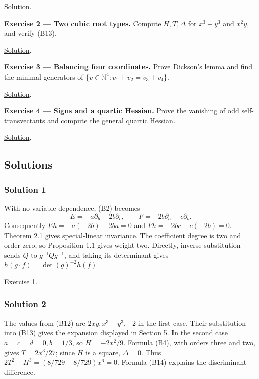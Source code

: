 \documentclass[
]{article}
\begin{document}
\hyperref[solution-1]{Solution}.

\protect{}\label{exercise-2}{}

\textbf{Exercise 2 --- Two cubic root types.} Compute \(H,T,\Delta\) for
\(x^3+y^3\) and \(x^2y\), and verify (B13).

\hyperref[solution-2]{Solution}.

\protect{}\label{exercise-3}{}

\textbf{Exercise 3 --- Balancing four coordinates.} Prove Dickson's
lemma and find the minimal generators of
\(\{v\in\mathbb N^4:v_1+v_2=v_3+v_4\}\).

\hyperref[solution-3]{Solution}.

\protect{}\label{exercise-4}{}

\textbf{Exercise 4 --- Signs and a quartic Hessian.} Prove the vanishing
of odd self-transvectants and compute the general quartic Hessian.

\hyperref[solution-4]{Solution}.

\subsection{Solutions}\label{solutions}

\subsubsection{Solution 1}\label{solution-1}

With no variable dependence, (B2) becomes \[
E=-a\partial_b-2b\partial_c,\qquad
F=-2b\partial_a-c\partial_b.
\] Consequently \(Eh=-a(-2b)-2ba=0\) and \(Fh=-2bc-c(-2b)=0\). Theorem
2.1 gives special-linear invariance. The coefficient degree is two and
order zero, so Proposition 1.1 gives weight two. Directly, inverse
substitution sends \(Q\) to \(g^{-\mathsf t}Qg^{-1}\), and taking its
determinant gives \(h(g\cdot f)=\det(g)^{-2}h(f)\).

\hyperref[exercise-1]{Exercise 1}.

\subsubsection{Solution 2}\label{solution-2}

The values from (B12) are \(2xy,x^3-y^3,-2\) in the first case. Their
substitution into (B13) gives the expansion displayed in Section 5. In
the second case \(a=c=d=0,b=1/3\), so \(H=-2x^2/9\). Formula (B4), with
orders three and two, gives \(T=2x^3/27\); since \(H\) is a square,
\(\Delta=0\). Thus \(2T^2+H^3=(8/729-8/729)x^6=0\). Formula (B14)
explains the discriminant difference.
\end{document}
